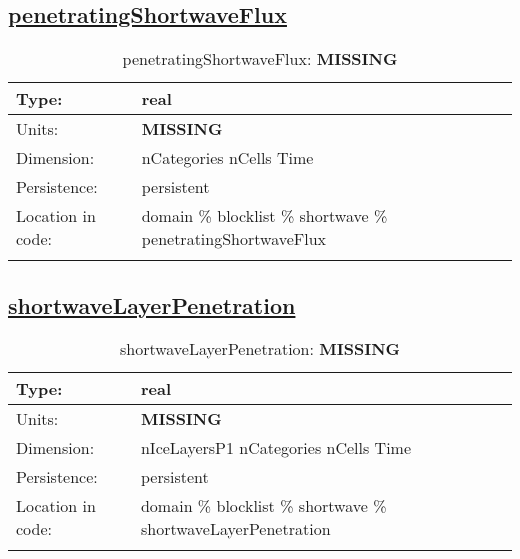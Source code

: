 \subsection[penetratingShortwaveFlux]{\hyperref[sec:var_tab_shortwave]{penetratingShortwaveFlux}}
\label{subsec:var_sec_shortwave_penetratingShortwaveFlux}
\begin{center}
\begin{longtable}{| p{2.0in} | p{4.0in} |}
        \hline 
        Type: & real \\
        \hline 
        Units: & {\bf \color{red} MISSING} \\
        \hline 
        Dimension: & nCategories nCells Time \\
        \hline 
        Persistence: & persistent \\
        \hline 
         Location in code: & domain \% blocklist \% shortwave \% penetratingShortwaveFlux \\
         \hline 
    \caption{penetratingShortwaveFlux: {\bf \color{red} MISSING}}
\end{longtable}
\end{center}
\subsection[shortwaveLayerPenetration]{\hyperref[sec:var_tab_shortwave]{shortwaveLayerPenetration}}
\label{subsec:var_sec_shortwave_shortwaveLayerPenetration}
\begin{center}
\begin{longtable}{| p{2.0in} | p{4.0in} |}
        \hline 
        Type: & real \\
        \hline 
        Units: & {\bf \color{red} MISSING} \\
        \hline 
        Dimension: & nIceLayersP1 nCategories nCells Time \\
        \hline 
        Persistence: & persistent \\
        \hline 
         Location in code: & domain \% blocklist \% shortwave \% shortwaveLayerPenetration \\
         \hline 
    \caption{shortwaveLayerPenetration: {\bf \color{red} MISSING}}
\end{longtable}
\end{center}
